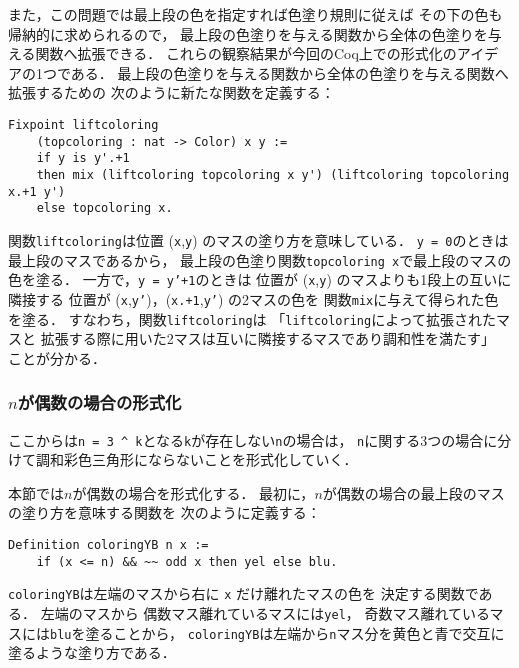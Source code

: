 また，この問題では最上段の色を指定すれば色塗り規則に従えば
その下の色も帰納的に求められるので，
最上段の色塗りを与える関数から全体の色塗りを与える関数へ拡張できる．
これらの観察結果が今回のCoq上での形式化のアイデアの1つである．
最上段の色塗りを与える関数から全体の色塗りを与える関数へ拡張するための
次のように新たな関数を定義する：
\begin{lstlisting}[language=Coq]
  Fixpoint liftcoloring
    (topcoloring : nat -> Color) x y :=
    if y is y'.+1
    then mix (liftcoloring topcoloring x y') (liftcoloring topcoloring x.+1 y')
    else topcoloring x.
\end{lstlisting}
関数{\tt{liftcoloring}}は位置 ({\tt{x}},{\tt{y}}) のマスの塗り方を意味している．
{\tt{y = 0}}のときは最上段のマスであるから，
最上段の色塗り関数{\tt{topcoloring x}}で最上段のマスの色を塗る．
一方で，{\tt{y = y'+1}}のときは
位置が ({\tt{x}},{\tt{y}}) のマスよりも1段上の互いに隣接する
位置が ({\tt{x}},{\tt{y'}})，({\tt{x.+1}},{\tt{y'}}) の2マスの色を
関数{\tt{mix}}に与えて得られた色を塗る．
すなわち，関数{\tt{liftcoloring}}は
「{\tt{liftcoloring}}によって拡張されたマスと
  拡張する際に用いた2マスは互いに隣接するマスであり調和性を満たす」
ことが分かる．

\subsubsection{$n$が偶数の場合の形式化}
ここからは{\tt{n = 3 \verb|^| k}}となる{\tt{k}}が存在しない{\tt{n}}の場合は，
{\tt{n}}に関する3つの場合に分けて調和彩色三角形にならないことを形式化していく．

本節では$n$が偶数の場合を形式化する．
最初に，$n$が偶数の場合の最上段のマスの塗り方を意味する関数を
次のように定義する：
\begin{lstlisting}[language=Coq]
  Definition coloringYB n x :=
    if (x <= n) && ~~ odd x then yel else blu.
\end{lstlisting}
{\tt{coloringYB}}は左端のマスから右に {\tt{x}} だけ離れたマスの色を
決定する関数である．
左端のマスから
偶数マス離れているマスには{\tt{yel}}，
奇数マス離れているマスには{\tt{blu}}を塗ることから，
{\tt{coloringYB}}は左端から{\tt{n}}マス分を黄色と青で交互に
塗るような塗り方である．

